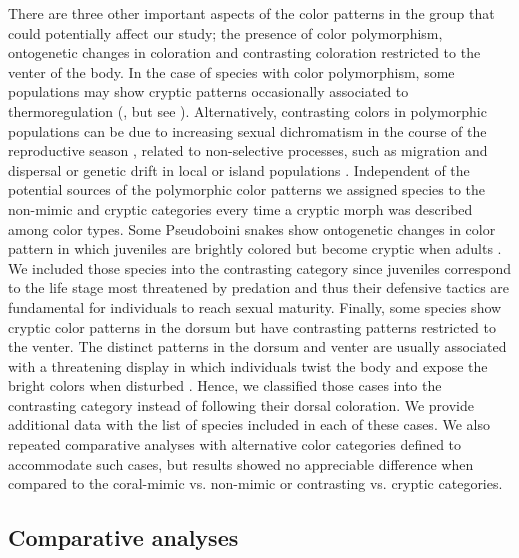 There are three other important aspects of the color patterns in the group that could potentially affect our study; the presence of color polymorphism, ontogenetic changes in coloration and contrasting coloration restricted to the venter of the body. In the case of species with color polymorphism, some populations may show cryptic patterns occasionally associated to thermoregulation (\citealp{tanaka_2005}, but see \citealp{lorioux_2008}). Alternatively, contrasting colors in polymorphic populations can be due to increasing sexual dichromatism in the course of the reproductive season \citep{forsman_opposing_1995, lindell_1996}, related to non-selective processes, such as migration and dispersal \citep{king_color_1995} or genetic drift in local \citep{brakefield_genetic_1990} or island populations \citep{bittner_gene_2003}. Independent of the potential sources of the polymorphic color patterns we assigned species to the non-mimic and cryptic categories every time a cryptic morph was described among color types. Some Pseudoboini snakes \citep[\textit{sensu}][]{zaher_2009} show ontogenetic changes in color pattern in which juveniles are brightly colored but become cryptic when adults \citep{martins_1998}. We included those species into the contrasting category since juveniles correspond to the life stage most threatened by predation \citep{bonnet_dangers_1999} and thus their defensive tactics are fundamental for individuals to reach sexual maturity. Finally, some species show cryptic color patterns in the dorsum but have contrasting patterns restricted to the venter. The distinct patterns in the dorsum and venter are usually associated with a threatening display in which individuals twist the body and expose the bright colors when disturbed \citep{martins_1993, sawaya_2008, tozetti_2009}. Hence, we classified those cases into the contrasting category instead of following their dorsal coloration. We provide additional data with the list of species included in each of these cases. We also repeated comparative analyses with alternative color categories defined to accommodate such cases, but results showed no appreciable difference when compared to the coral-mimic vs. non-mimic or contrasting vs. cryptic categories.

\subsection{Comparative analyses}

